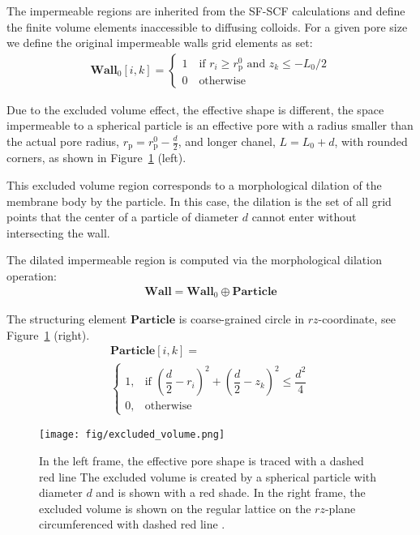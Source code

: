 \documentclass[10pt, a4paper, twocolumn]{article}
\begin{document}
The impermeable regions are inherited from the SF-SCF calculations and define the finite volume elements inaccessible to diffusing colloids.
For a given pore size we define the original impermeable walls grid elements as set:
\begin{eqnarray}
    \textbf{Wall}_{0} [i,k] = 
    \begin{cases}
        1 \quad \text{if } r_i \ge r_{\text{p}}^0 \text{ and } z_k \le -L_0/2 \\
        0 \quad \text{otherwise}
    \end{cases}
\end{eqnarray}

Due to the excluded volume effect, the effective shape is different, the space impermeable to a spherical particle is an effective pore with a radius smaller than the actual pore radius, $r_{\text{p}} = r_{\text{p}}^{0} - \frac{d}{2}$, and longer chanel, $L = L_{0} + d$, with rounded corners, as shown in Figure~\ref{fig:excluded_volume} (left).

This excluded volume region corresponds to a morphological dilation of the membrane body by the particle. In this case, the dilation is the set of all grid points that the center of a particle of diameter $d$ cannot enter without intersecting the wall.

The dilated impermeable region is computed via the morphological dilation operation:
\begin{eqnarray}
    \textbf{Wall} = \textbf{Wall}_{0} \oplus \textbf{Particle}
\end{eqnarray}

The structuring element $\textbf{Particle}$ is coarse-grained circle in $rz$-coordinate, see Figure~\ref{fig:excluded_volume} (right).
\begin{equation}
    \begin{gathered}
        \textbf{Particle}[i,k] = \\
        \begin{cases}
                1, & \text{if } \left( \dfrac{d}{2} - r_i\right)^2 + \left( \dfrac{d}{2} - z_k\right)^2 \le \dfrac{d^2}{4} \\[5pt]
                0, & \text{otherwise}
            \end{cases}
    \end{gathered}
\end{equation}

\begin{figure}[]
    \centering
    \texttt{[image: fig/excluded\_volume.png]}
    \caption{
        In the left frame, the effective pore shape is traced with a dashed red line
        The excluded volume is created by a spherical particle with diameter $d$ and is shown with a red shade.
        In the right frame, the excluded volume is shown on the regular lattice on the $rz$-plane circumferenced with dashed red line .
        }
    \label{fig:excluded_volume}
\end{figure}
\end{document}
